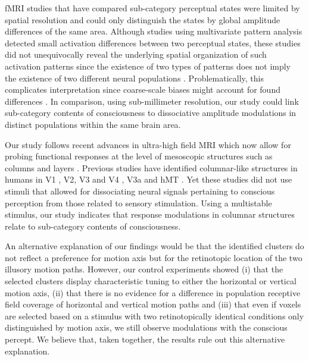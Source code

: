 fMRI studies that have compared sub-category perceptual states \parencite{Sterzer2002,Muckli2002,Castelo-Branco2002} were limited by spatial resolution and could only distinguish the states by global amplitude differences of the same area. Although studies using multivariate pattern analysis \parencite{Kamitani2006, Brouwer2007} detected small activation differences between two perceptual states, these studies did not unequivocally reveal the underlying spatial organization of such activation patterns \parencite{Logothetis2008} since the existence of two types of patterns does not imply the existence of two different neural populations \parencite{Bartels2008}. Problematically, this complicates interpretation since coarse-scale biases might account for found differences \parencite{Wang2014}. In comparison, using sub-millimeter resolution, our study could link sub-category contents of consciousness to dissociative amplitude modulations in distinct populations within the same brain area.

Our study follows recent advances in ultra-high field MRI which now allow for probing functional responses at the level of mesoscopic structures such as columns and layers \parencite{Polimeni2017, DeMartino2016, Kemper2017}. Previous studies have identified columnar-like structures in humans in V1 \parencite{Cheng2001, Yacoub2008}, V2, V3 and V4 \parencite{Nasr2016, Tootell2017}, V3a \parencite{Goncalves2015} and hMT \parencite{Zimmermann2011}. Yet these studies did not use stimuli that allowed for dissociating neural signals pertaining to conscious perception from those related to sensory stimulation. Using a multistable stimulus, our study indicates that response modulations in columnar structures relate to sub-category contents of consciousness.

An alternative explanation of our findings would be that the identified clusters do not reflect a preference for motion axis but for the retinotopic location of the two illusory motion paths. However, our control experiments showed (i) that the selected clusters display characteristic tuning to either the horizontal or vertical motion axis, (ii) that there is no evidence for a difference in population receptive field coverage of horizontal and vertical motion paths and (iii) that even if voxels are selected based on a stimulus with two retinotopically identical conditions only distinguished by motion axis, we still observe modulations with the conscious percept. We believe that, taken together, the results rule out this alternative explanation.


